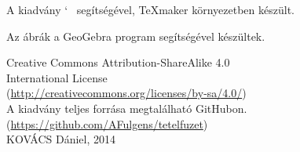 
\newpage
\thispagestyle{empty}
\null\vfill
\begin{center}
  A kiadv\'{a}ny \AmS{}`~\LaTeXe{} seg\'{i}ts\'{e}g\'{e}vel, \TeX{}maker
  k\"{o}rnyezetben k\'{e}sz\"{u}lt.
	
  Az \'{a}br\'{a}k a GeoGebra program seg\'{i}ts\'{e}g\'{e}vel
  k\'{e}sz\"{u}ltek.\\[4ex]	
	
  {\Large\cc\bysa}
  
  Creative Commons Attribution-ShareAlike 4.0\\
  International License\\
  (\url{http://creativecommons.org/licenses/by-sa/4.0/})\\[4ex]
  
  A kiadv\'{a}ny teljes forr\'{a}sa megtal\'{a}lhat\'{o} GitHubon.\\
  (\url{https://github.com/AFulgens/tetelfuzet})\\[4ex]  
  
  KOV\'{A}CS D\'{a}niel, 2014
\end{center} 